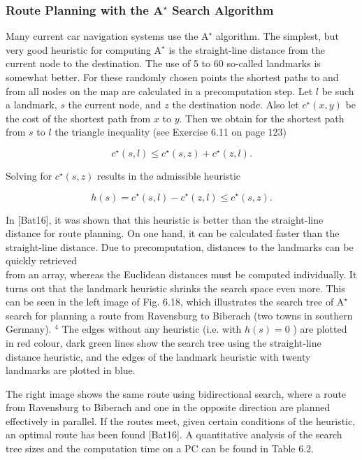\documentclass[10pt]{article}
\begin{document}
\subsubsection*{Route Planning with the $\mathbf{A}^{\boldsymbol{\star}}$ Search Algorithm}
Many current car navigation systems use the $\mathrm{A}^{\star}$ algorithm. The simplest, but very good heuristic for computing $\mathrm{A}^{\star}$ is the straight-line distance from the current node to the destination. The use of 5 to 60 so-called landmarks is somewhat better. For these randomly chosen points the shortest paths to and from all nodes on the map are calculated in a precomputation step. Let $l$ be such a landmark, $s$ the current node, and $z$ the destination node. Also let $c^{\star}(x, y)$ be the cost of the shortest path from $x$ to $y$. Then we obtain for the shortest path from $s$ to $l$ the triangle inequality (see Exercise 6.11 on page 123)

$$
c^{\star}(s, l) \leq c^{\star}(s, z)+c^{\star}(z, l) .
$$

Solving for $c^{\star}(s, z)$ results in the admissible heuristic

$$
h(s)=c^{\star}(s, l)-c^{\star}(z, l) \leq c^{\star}(s, z) .
$$

In [Bat16], it was shown that this heuristic is better than the straight-line distance for route planning. On one hand, it can be calculated faster than the straight-line distance. Due to precomputation, distances to the landmarks can be quickly retrieved\\
from an array, whereas the Euclidean distances must be computed individually. It turns out that the landmark heuristic shrinks the search space even more. This can be seen in the left image of Fig. 6.18, which illustrates the search tree of $\mathrm{A}^{\star}$ search for planning a route from Ravensburg to Biberach (two towns in southern Germany). ${ }^{4}$ The edges without any heuristic (i.e. with $h(s)=0$ ) are plotted in red colour, dark green lines show the search tree using the straight-line distance heuristic, and the edges of the landmark heuristic with twenty landmarks are plotted in blue.

The right image shows the same route using bidirectional search, where a route from Ravensburg to Biberach and one in the opposite direction are planned effectively in parallel. If the routes meet, given certain conditions of the heuristic, an optimal route has been found [Bat16]. A quantitative analysis of the search tree sizes and the computation time on a PC can be found in Table 6.2.
\end{document}
